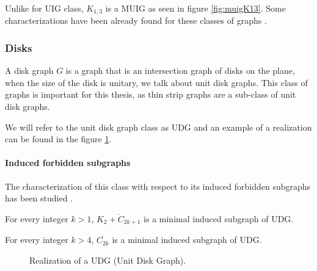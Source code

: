Unlike for UIG class, $K_{1,3}$ is a MUIG as seen in figure \ref{fig:muigK13}. Some
characterizations have been already found for these classes of graphs \cite{shuchatUnitMixedInterval2014a}
\cite{joosCharacterizationMixedUnit2013}.


\subsubsection{Disks}

A disk graph $G$ is a graph that is an intersection graph of disks on the plane, when the size
of the disk is unitary, we talk about unit disk graphs. This class of graphs
is important for this thesis, as thin strip graphs are a sub-class of
unit disk graphs.

We will refer to the unit disk graph class as UDG and an example of a realization
can be found in the figure \ref{fig:udg}.

\paragraph{Induced forbidden subgraphs} The characterization of this class with respect to
its induced forbidden subgraphs has been studied \cite{atminasForbiddenInducedSubgraphs2016}.

\begin{theorem}
  For every integer $k > 1$, $\overline{K_2 + C_{2k+1}}$ is a minimal induced subgraph of UDG.
\end{theorem}

\begin{theorem}
  For every integer $k > 4$, $\overline{C_{2k}}$ is a minimal induced subgraph of UDG.
\end{theorem}

\begin{figure}
\centering

\begin{scaletikzpicturetowidth}{\textwidth}
\end{scaletikzpicturetowidth}

\caption{Realization of a UDG (Unit Disk Graph).}
\label{fig:udg}
\end{figure}
